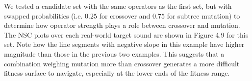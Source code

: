 \documentclass[a4paper,12pt]{report} 	%
\numberwithin{figure}{chapter}
\numberwithin{table}{chapter}
\numberwithin{equation}{chapter}
\begin{document}
\begin{flushleft}
We tested a candidate set with the same operators as the first set, but with swapped probabilities (i.e. $0.25$ for crossover and $0.75$ for subtree mutation) to determine how operator strength plays a role between crossover and mutation. The NSC plots over each real-world target sound are shown in Figure 4.9 for this set.
Note how the line segments with negative slope in this example have higher magnitude than those in the previous two examples. This suggests that a combination weighing mutation more than crossover generates a more difficult fitness surface to navigate, especially at the lower ends of the fitness range.


\end{flushleft}
\end{document}
